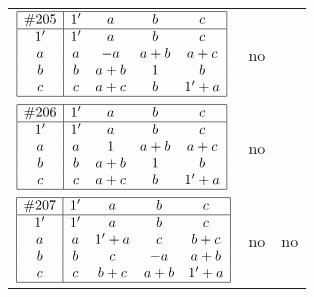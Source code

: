 \documentclass[12pt]{article}
\theoremstyle{definition}
\newcommand{\join}{\mathbin{+}}%
\newcommand{\id}{{1'}}%
\renewcommand{\top}{1}%
\begin{document}
\begin{center}
\begin{longtable}{l|c|c}
$
\begin{array}{|c|cccc|} \hline
\#205 & \id & a & b & c \\ \hline
\id & \id & a & b & c \\
a & a & -a & a \join b & a \join c \\
b & b & a \join b & \top & b \\
c & c & a \join c & b & \id \join a \\ \hline
\end{array}
$
 & no  
 & \adjustbox{valign=c, max height=1.6cm}{$
\left[ \begin{array}{ccccccc}
\id & a & b & c & b & b & b \\ 
a & \id & a & a & b & b & b \\ 
b & a & \id & b & b & b & b \\ 
c & a & b & \id & b & b & b \\ 
b & b & b & b & \id & c & a \\ 
b & b & b & b & c & \id & c \\ 
b & b & b & b & a & c & \id
\end{array}\right]
$}      \\[15mm]

$
\begin{array}{|c|cccc|} \hline
\#206 & \id & a & b & c \\ \hline
\id & \id & a & b & c \\
a & a & \top & a \join b & a \join c \\
b & b & a \join b & \top & b \\
c & c & a \join c & b & \id \join a \\ \hline
\end{array}
$
 & no  
 & \adjustbox{valign=c, max height=1.6cm}{$
\left[ \begin{array}{cccccc}
\id & a & a & b & c & b \\ 
a & \id & a & a & a & b \\ 
a & a & \id & b & c & b \\ 
b & a & b & \id & b & b \\ 
c & a & c & b & \id & b \\ 
b & b & b & b & b & \id
\end{array}\right]
$}
      \\[15mm]

$
\begin{array}{|c|cccc|} \hline
\#207 & \id & a & b & c \\ \hline
\id & \id & a & b & c \\
a & a & \id \join a & c & b \join c \\
b & b & c & -a & a \join b \\
c & c & b \join c & a \join b & \id \join a \\ \hline
\end{array}
$
 & no  
 & no      \\[15mm]


\end{longtable}
\end{center}
\end{document}
